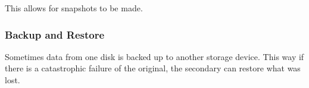 This allows for snapshots to be made.

\subsubsection{Backup and Restore}\label{subsubsec:Backup_Restore}
Sometimes data from one disk is backed up to another storage device.
This way if there is a catastrophic failure of the original, the secondary can restore what was lost.

